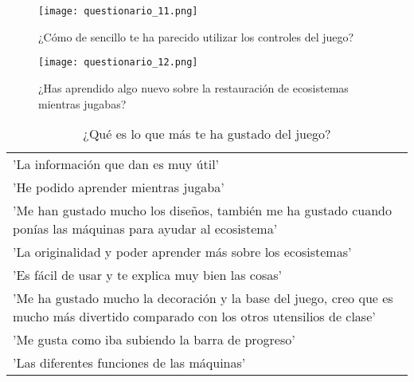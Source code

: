 \begin{figure}[H]
  \centering
  \texttt{[image: questionario\_11.png]}
  \caption{¿Cómo de sencillo te ha parecido utilizar los controles del juego?}
  \label{fig:questionario_11}
\end{figure}
\raggedbottom

\begin{figure}[H]
  \centering
  \texttt{[image: questionario\_12.png]}
  \caption{¿Has aprendido algo nuevo sobre la restauración de ecosistemas mientras jugabas?}
  \label{fig:questionario_12}
\end{figure}
\raggedbottom

\begin{table}[H]
  \begin{center}
  \setlength{\tabcolsep}{5pt}
  \renewcommand{\arraystretch}{1.2}
  \begin{tabular}{ | m{\textwidth} | } 
    \hline
    'La información que dan es muy útil' \\ 
    'He podido aprender mientras jugaba' \\ 
    'Me han gustado mucho los diseños, también me ha gustado cuando ponías las máquinas para ayudar al ecosistema' \\ 
    'La originalidad y poder aprender más sobre los ecosistemas' \\ 
    'Es fácil de usar y te explica muy bien las cosas' \\ 
    'Me ha gustado mucho la decoración y la base del juego, creo que es mucho más divertido comparado con los otros utensilios de clase' \\ 
    'Me gusta como iba subiendo la barra de progreso' \\ 
    'Las diferentes funciones de las máquinas' \\ 
    \hline
  \end{tabular}
  \centering
  \caption{¿Qué es lo que más te ha gustado del juego?}
  \label{fig:tablaResultadosPC}
  \end{center}
\end{table}  
 
